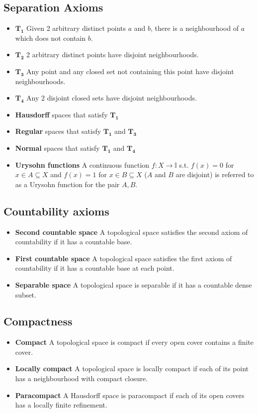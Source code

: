 \documentclass{article}
\begin{document}
\subsection{Separation Axioms}
\begin{itemize}
\item \textbf{\(\mathbf{T_{1}}\)} Given 2 arbitrary distinct points \(a\) and \(b\), there is a neighbourhood of \(a\) which does not contain \(b\).
\item \textbf{\(\mathbf{T_{2}}\)} 2 arbitrary distinct points have disjoint neighbourhoods.
\item \textbf{\(\mathbf{T_{3}}\)} Any point and any closed set not containing this point have disjoint neighbourhoods.
\item \textbf{\(\mathbf{T_{4}}\)} Any 2 disjoint closed sets have disjoint neighbourhoods.
\item \textbf{Hausdorff} spaces that satisfy \(\mathbf{T_{1}}\)
\item \textbf{Regular} spaces that satisfy \(\mathbf{T_{1}}\) and \(\mathbf{T_{3}}\)
\item \textbf{Normal} spaces that satisfy \(\mathbf{T_{1}}\) and \(\mathbf{T_{4}}\)
\item \textbf{Urysohn functions} A continuous function \(f:X\to\mathbb{I}\) s.t. \(f(x)=0\) for \(x\in A\subseteq X\) and \(f(x)=1\) for \(x\in B\subseteq X\) (\(A\) and \(B\) are disjoint) is referred to as a Urysohn function for the pair \(A,B\).
\end{itemize}
\subsection{Countability axioms}
\begin{itemize}
\item \textbf{Second countable space} A topological space satisfies the second axiom of countability if it has a countable base.
\item \textbf{First countable space} A topological space satisfies the first axiom of countability if it has a countable base at each point.
\item \textbf{Separable space} A topological space is separable if it has a countable dense subset.
\end{itemize}
\subsection{Compactness}
\begin{itemize}
\item \textbf{Compact} A topological space is compact if every open cover contains a finite cover.
\item \textbf{Locally compact} A topological space is locally compact if each of its point has a neighbourhood with compact closure.
\item \textbf{Paracompact} A Hausdorff space is paracompact if each of its open covers has a locally finite refinement.
\end{itemize}
\end{document}
